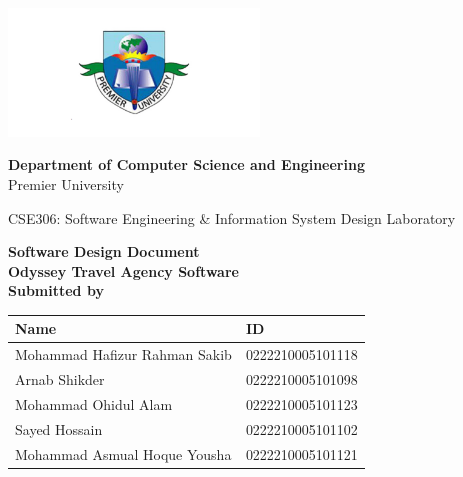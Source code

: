 \documentclass{scrreprt}
\begin{document}
\begin{titlepage}
    \centering
    \begin{center}
        \includegraphics[width=0.5\textwidth]{logo.png} %
    \end{center}
\begin{center}
    \textbf{Department of Computer Science and Engineering}\\
    Premier University
\end{center}
\begin{center}
    \textnormal{ CSE306: Software Engineering \& Information System Design Laboratory }
\end{center}
    \huge
    \textbf{Software Design Document}\\
    \vspace{0.5in}
    \LARGE
    \textbf{Odyssey Travel Agency Software}\\
    \vspace{1in}
    \large
    \textbf {Submitted by}\\
    \begin{center}
        \renewcommand{\arraystretch}{1.5} %
        \begin{tabular}{|>{\raggedright\arraybackslash}p{}|p{}|} %
        \hline
        \textbf{Name} & \textbf{ID} \\
        \hline
        Mohammad Hafizur Rahman Sakib & 0222210005101118 \\
        \hline
        Arnab Shikder & 0222210005101098 \\
        \hline
        Mohammad Ohidul Alam & 0222210005101123 \\
        \hline
        Sayed Hossain & 0222210005101102 \\
        \hline
        Mohammad Asmual Hoque Yousha & 0222210005101121 \\
        \hline
        \end{tabular}
        \end{center}
    \vspace{0.5in}
 

\end{titlepage}
\end{document}
